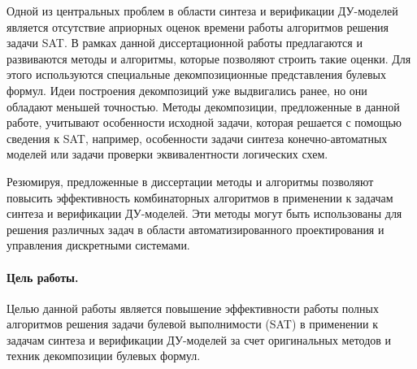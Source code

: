 Одной из центральных проблем в области синтеза и верификации ДУ-моделей является отсутствие априорных оценок времени работы алгоритмов решения задачи SAT.
В рамках данной диссертационной работы предлагаются и развиваются методы и алгоритмы, которые позволяют строить такие оценки.
Для этого используются специальные декомпозиционные представления булевых формул.
Идеи построения декомпозиций уже выдвигались ранее, но они обладают меньшей точностью.
Методы декомпозиции, предложенные в данной работе, учитывают особенности исходной задачи, которая решается с помощью сведения к SAT, например, особенности задачи синтеза конечно-автоматных моделей или задачи проверки эквивалентности логических схем.

Резюмируя, предложенные в диссертации методы и алгоритмы позволяют повысить эффективность комбинаторных алгоритмов в применении к задачам синтеза и верификации ДУ-моделей.
Эти методы могут быть использованы для решения различных задач в области автоматизированного проектирования и управления дискретными системами.


\paragraph*{Цель работы.}
%
Целью данной работы является повышение эффективности работы полных алгоритмов решения задачи булевой выполнимости (SAT) в применении к задачам синтеза и верификации ДУ-моделей за счет оригинальных методов и техник декомпозиции булевых формул.


